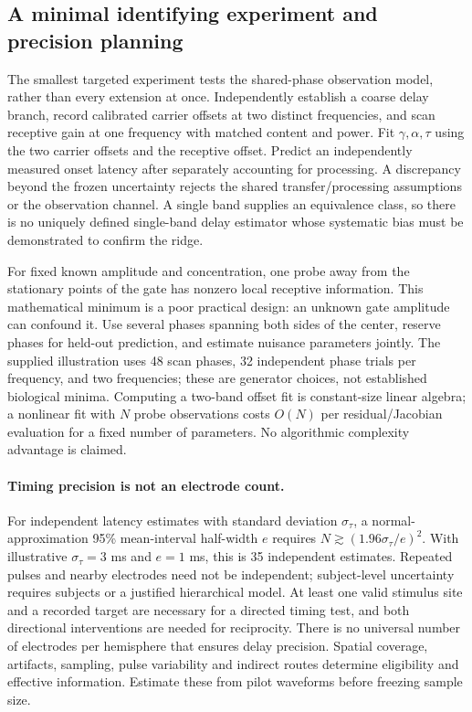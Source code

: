\subsection{A minimal identifying experiment and precision planning}\label{sec:minimal}
The smallest targeted experiment tests the shared-phase observation model, rather than every extension at once. Independently establish a coarse delay branch, record calibrated carrier offsets at two distinct frequencies, and scan receptive gain at one frequency with matched content and power. Fit $\gamma,\alpha,\tau$ using the two carrier offsets and the receptive offset. Predict an independently measured onset latency after separately accounting for processing. A discrepancy beyond the frozen uncertainty rejects the shared transfer/processing assumptions or the observation channel. A single band supplies an equivalence class, so there is no uniquely defined single-band delay estimator whose systematic bias must be demonstrated to confirm the ridge.

For fixed known amplitude and concentration, one probe away from the stationary points of the gate has nonzero local receptive information. This mathematical minimum is a poor practical design: an unknown gate amplitude can confound it. Use several phases spanning both sides of the center, reserve phases for held-out prediction, and estimate nuisance parameters jointly. The supplied illustration uses 48 scan phases, 32 independent phase trials per frequency, and two frequencies; these are generator choices, not established biological minima. Computing a two-band offset fit is constant-size linear algebra; a nonlinear fit with $N$ probe observations costs $O(N)$ per residual/Jacobian evaluation for a fixed number of parameters. No algorithmic complexity advantage is claimed.

\paragraph{Timing precision is not an electrode count.} For independent latency estimates with standard deviation $\sigma_\tau$, a normal-approximation 95\% mean-interval half-width $e$ requires $N\gtrsim(1.96\sigma_\tau/e)^2$. With illustrative $\sigma_\tau=3$ ms and $e=1$ ms, this is 35 independent estimates. Repeated pulses and nearby electrodes need not be independent; subject-level uncertainty requires subjects or a justified hierarchical model. At least one valid stimulus site and a recorded target are necessary for a directed timing test, and both directional interventions are needed for reciprocity. There is no universal number of electrodes per hemisphere that ensures delay precision. Spatial coverage, artifacts, sampling, pulse variability and indirect routes determine eligibility and effective information. Estimate these from pilot waveforms before freezing sample size.

